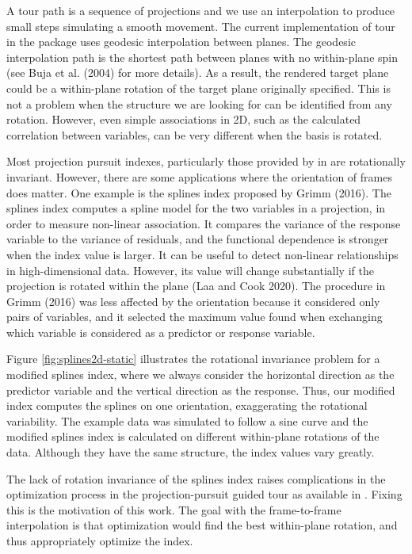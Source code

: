 A tour path is a sequence of projections and we use an interpolation to produce small steps simulating a smooth movement. The current implementation of tour in the  package uses geodesic interpolation between planes. The geodesic interpolation path is the shortest path between planes with no within-plane spin (see Buja et al. (2004) for more details). As a result, the rendered target plane could be a within-plane rotation of the target plane originally specified. This is not a problem when the structure we are looking for can be identified from any rotation. However, even simple associations in 2D, such as the calculated correlation between variables, can be very different when the basis is rotated.

Most projection pursuit indexes, particularly those provided by in  are rotationally invariant. However, there are some applications where the orientation of frames does matter. One example is the splines index proposed by Grimm (2016). The splines index computes a spline model for the two variables in a projection, in order to measure non-linear association. It compares the variance of the response variable to the variance of residuals, and the functional dependence is stronger when the index value is larger. It can be useful to detect non-linear relationships in high-dimensional data. However, its value will change substantially if the projection is rotated within the plane (Laa and Cook 2020). The procedure in Grimm (2016) was less affected by the orientation because it considered only pairs of variables, and it selected the maximum value found when exchanging which variable is considered as a predictor or response variable.

Figure \ref{fig:splines2d-static} illustrates the rotational invariance problem for a modified splines index, where we always consider the horizontal direction as the predictor variable and the vertical direction as the response. Thus, our modified index computes the splines on one orientation, exaggerating the rotational variability. The example data was simulated to follow a sine curve and the modified splines index is calculated on different within-plane rotations of the data. Although they have the same structure, the index values vary greatly.

The lack of rotation invariance of the splines index raises complications in the optimization process in the projection-pursuit guided tour as available in . Fixing this is the motivation of this work. The goal with the frame-to-frame interpolation is that optimization would find the best within-plane rotation, and thus appropriately optimize the index.

